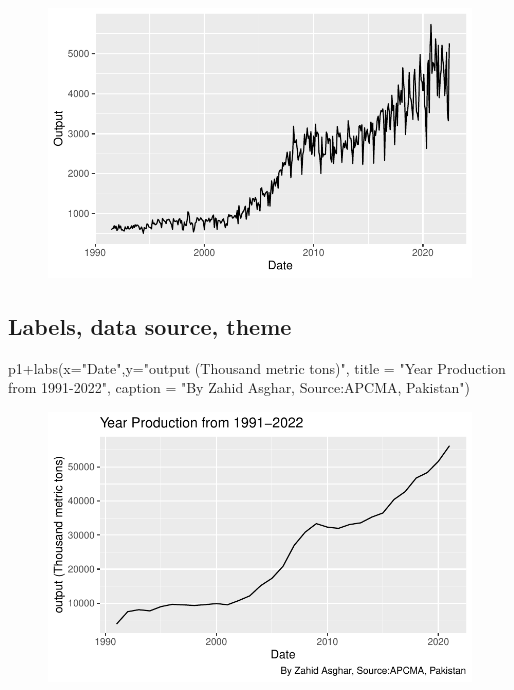 \documentclass[
  letterpaper,
  DIV=11,
  numbers=noendperiod]{scrartcl}
\newenvironment{Shaded}{\begin{snugshade}}{\end{snugshade}}
\newcommand{\AttributeTok}[1]{\textcolor[rgb]{0.40,0.45,0.13}{#1}}
\newcommand{\FunctionTok}[1]{\textcolor[rgb]{0.28,0.35,0.67}{#1}}
\newcommand{\NormalTok}[1]{\textcolor[rgb]{0.00,0.23,0.31}{#1}}
\newcommand{\SpecialCharTok}[1]{\textcolor[rgb]{0.37,0.37,0.37}{#1}}
\newcommand{\StringTok}[1]{\textcolor[rgb]{0.13,0.47,0.30}{#1}}
\begin{document}
\begin{figure}[H]

{\centering \includegraphics[width=17.1875in,height=\textheight]{cement_files/figure-pdf/unnamed-chunk-6-1.pdf}

}

\end{figure}

\hypertarget{labels-data-source-theme}{%
\subsection{Labels, data source, theme}\label{labels-data-source-theme}}

\begin{Shaded}
\begin{Highlighting}[]
\NormalTok{p1}\SpecialCharTok{+}\FunctionTok{labs}\NormalTok{(}\AttributeTok{x=}\StringTok{"Date"}\NormalTok{,}\AttributeTok{y=}\StringTok{"output (Thousand metric tons)"}\NormalTok{, }\AttributeTok{title =} \StringTok{"Year Production from 1991{-}2022"}\NormalTok{, }\AttributeTok{caption =} \StringTok{"By Zahid Asghar, Source:APCMA, Pakistan"}\NormalTok{)}
\end{Highlighting}
\end{Shaded}

\begin{figure}[H]

{\centering \includegraphics[width=17.1875in,height=\textheight]{cement_files/figure-pdf/unnamed-chunk-7-1.pdf}

}

\end{figure}
\end{document}

